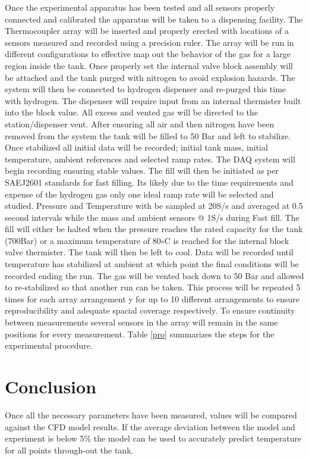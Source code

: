 \documentclass[paper=a4, fontsize=11pt, abstract=on]{scrartcl}
\numberwithin{equation}{section}		%
\numberwithin{figure}{section}			%
\numberwithin{table}{section}				%
\begin{document}
Once the experimental apparatus has been tested and all sensors properly connected and calibrated the apparatus will be taken to a dispensing facility. The Thermocoupler array will be inserted and properly erected with locations of a sensors measured and recorded using a precision ruler. The array will be run in different configurations to effective map out the behavior of the gas for a large region inside the tank. Once properly set the internal valve block assembly will be attached and the tank purged with nitrogen to avoid explosion hazards. The system will then be connected to hydrogen dispenser and re-purged this time with hydrogen. The dispenser will require input from an internal thermister built into the block value. All excess and vented gas will be directed to the station/dispenser vent. After ensuring all air and then nitrogen have been removed from the system the tank will be filled to 50 Bar and left to stabilize. Once stabilized all initial data will be recorded; initial tank mass, initial temperature, ambient references and selected ramp rates. The DAQ system will begin recording ensuring stable values. The fill will then be initiated as per SAEJ2601 standards for fast filling. Its likely due to the time requirements and expense of the hydrogen gas only one ideal ramp rate will be selected and studied. Pressure and Temperature with be sampled at 20S/s and averaged at 0.5 second intervals while the mass and ambient sensors @ 1S/s during Fast fill. The fill will either be halted when the pressure reaches the rated capacity for the tank (700Bar) or a maximum temperature of 80$\circ$C is reached for the internal block valve thermister. The tank will then be left to cool. Data will be recorded until temperature has stabilized at ambient at which point the final conditions will be recorded ending the run. The gas will be vented back down to 50 Bar and allowed to re-stabilized so that another run can be taken. This process will be repeated 5 times for each array arrangement y for up to 10 different arrangements to ensure reproducibility and adequate spacial coverage respectively. To ensure continuity between measurements several sensors in the array will remain in the same positions for every measurement. Table \ref{pro} summarizes the steps for the experimental procedure.



 


\section{Conclusion}
Once all the necessary parameters have been measured, values will be compared against the CFD model results. If the average deviation between the model and experiment is below 5\% the model can be used to accurately predict temperature for all points through-out the tank. 
\end{document}
